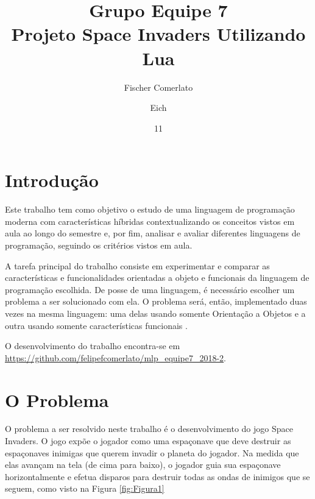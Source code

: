 \documentclass[rel_mlp]{iiufrgs}
\title{Grupo Equipe 7 \\ Projeto Space Invaders Utilizando Lua}
\author{Fischer Comerlato}{Felipe} %
\author{Eich}{Leonardo} %
\date{11}{2018}
\begin{document}
\maketitle      


\tableofcontents








%
\chapter{Introdução} \label{intro}

Este trabalho tem como objetivo o estudo de uma linguagem de programação moderna com características híbridas contextualizando os conceitos vistos em aula ao longo do semestre e, por fim, analisar e avaliar diferentes linguagens de programação, seguindo os critérios vistos em aula.

A tarefa principal do trabalho consiste em experimentar e comparar as características e funcionalidades orientadas a objeto e funcionais da linguagem de programação escolhida. De posse de uma linguagem, é necessário escolher um problema a ser solucionado com ela. O problema será, então, implementado duas vezes na mesma linguagem: uma delas usando somente Orientação a Objetos e a outra usando somente características funcionais \cite{AboutLua:2018:Online}.

O desenvolvimento do trabalho encontra-se em \url{https://github.com/felipefcomerlato/mlp_equipe7_2018-2}.


\chapter{O Problema}
O problema a ser resolvido neste trabalho é o desenvolvimento do jogo Space Invaders. O jogo expõe o jogador como uma espaçonave que deve destruir as espaçonaves inimigas que querem invadir o planeta do jogador. Na medida que elas avançam na tela (de cima para baixo), o jogador guia sua espaçonave horizontalmente e efetua disparos para destruir todas as ondas de inimigos que se seguem, como visto na Figura \ref{fig:Figura1}
\end{document}
